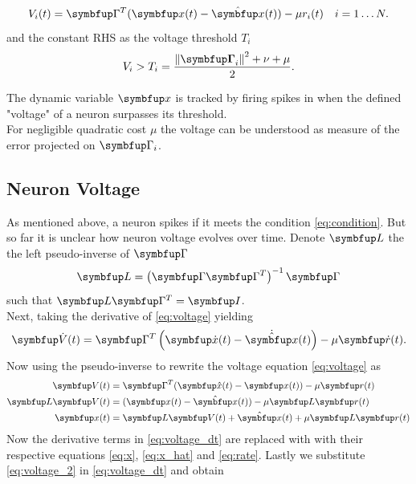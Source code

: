 \begin{equation}\label{eq:voltage}
V_i(t)=\bmu{\Gamma}^T(\bmu{x}(t)-\hat{\bmu{x}}(t))-\mu r_i(t)
\quad i  = 1\dots N.
\end{equation}
and the constant \ac{RHS} as the voltage threshold $T_i$
\begin{equation}\label{eq:condition}
V_i>T_i=\frac{\left\|\boldsymbol{\bmu{\Gamma}}_i\right\|^2 + \nu+\mu}{2}.
\end{equation}

The dynamic variable $\bmu{x}$ is tracked by firing spikes in when the defined "voltage" of a neuron surpasses its threshold.\\
For negligible quadratic cost $\mu$ the voltage can be understood as measure of the error projected on $\bmu{\Gamma}_i$.
\subsection{Neuron Voltage}
As mentioned above, a neuron spikes if it meets the condition \cref{eq:condition}. But so far it is unclear how neuron voltage evolves over time.
Denote $\bmu{L}$ the the left pseudo-inverse of $\bmu{\Gamma}$
\begin{equation}
\bmu{L} = \left(\bmu{\Gamma}\bmu{\Gamma}^T\right)^{-1}\bmu{\Gamma}
\end{equation}
such that $\bmu{L}\bmu{\Gamma}^T = \bmu{I}$.\\
Next, taking the derivative of \cref{eq:voltage} yielding
\begin{equation}\label{eq:voltage_dt}
\bmu{\dot{V}}(t)=\bmu{\Gamma}^T\left(\bmu{\dot{x}}(t)-\dot{\hat{\bmu{x}}}(t)\right)-\mu \bmu{\dot{r}}(t).
\end{equation}
Now using the pseudo-inverse to rewrite the voltage equation \cref{eq:voltage} as
\begin{equation}\label{eq:voltage_2}
\begin{aligned}
\bmu{V}(t)&=\bmu{\Gamma}^T(\bmu{\hat{x}}(t)-\bmu{x}(t))-\mu \bmu{r}(t)\\
\bmu{L}\bmu{V}(t)&=(\bmu{x}(t)-\hat{\bmu{x}}(t))-\mu \bmu{L}\bmu{r}(t)\\
\bmu{x}(t)&=\bmu{L}\bmu{V}(t)  + \hat{\bmu{x}}(t) + \mu \bmu{L}\bmu{r}(t)\\
\end{aligned}
\end{equation}
Now the derivative terms in \cref{eq:voltage_dt} are replaced with  with their respective equations \cref{eq:x}, \cref{eq:x_hat} and \cref{eq:rate}. Lastly we substitute \cref{eq:voltage_2} in \cref{eq:voltage_dt} and obtain
